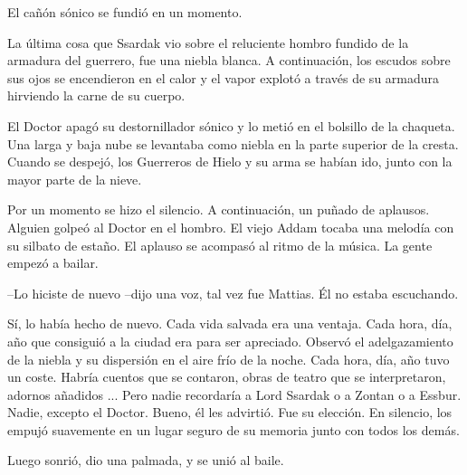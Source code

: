 El cañón sónico se fundió en un momento.



La última cosa que Ssardak vio sobre el reluciente hombro fundido de la armadura del guerrero, fue una niebla blanca. A continuación, los escudos sobre sus ojos se encendieron en el calor y el vapor explotó a través de su armadura hirviendo la carne de su cuerpo.



\mbox{}



El Doctor apagó su destornillador sónico y lo metió en el bolsillo de la chaqueta. Una larga y baja  nube se levantaba como niebla en la parte superior de la cresta. Cuando se despejó, los Guerreros de Hielo y su arma se habían ido, junto con la mayor parte de la nieve.



Por un momento se hizo el silencio. A continuación, un puñado de aplausos. Alguien golpeó al Doctor en el hombro. El viejo Addam tocaba una melodía con su silbato de estaño. El aplauso se acompasó al ritmo de la música. La gente empezó a bailar.



--Lo hiciste de nuevo --dijo una voz, tal vez fue Mattias. Él no estaba escuchando.



Sí, lo había hecho de nuevo. Cada vida salvada era una ventaja. Cada hora, día, año que consiguió a la ciudad era para ser apreciado. Observó el adelgazamiento de la niebla y su dispersión en el aire frío de la noche. Cada hora, día, año tuvo un coste. Habría cuentos que se contaron, obras de teatro que se interpretaron, adornos añadidos ... Pero nadie recordaría a Lord Ssardak o a Zontan o a Essbur. Nadie, excepto el Doctor. Bueno, él les advirtió. Fue su elección. En silencio, los empujó suavemente en un lugar seguro de su memoria junto con todos los demás.



Luego sonrió, dio una palmada, y se unió al baile.
